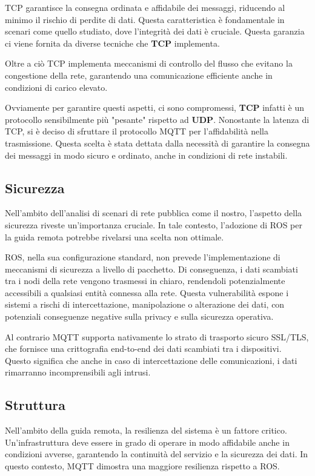 \noindent TCP garantisce la consegna ordinata e affidabile dei messaggi, riducendo al minimo il rischio di perdite di dati. Questa caratteristica è fondamentale in scenari come quello studiato, dove l'integrità dei dati è cruciale. Questa garanzia ci viene fornita da diverse tecniche che \textbf{TCP} implementa. 

\noindent Oltre a ciò TCP implementa meccanismi di controllo del flusso che evitano la congestione della rete, garantendo una comunicazione efficiente anche in condizioni di carico elevato.

\noindent Ovviamente per garantire questi aspetti, ci sono compromessi, \textbf{TCP} infatti è un protocollo sensibilmente più "pesante" rispetto ad \textbf{UDP}. Nonostante la latenza di TCP, si è deciso di sfruttare il protocollo MQTT per l'affidabilità nella trasmissione. Questa scelta è stata dettata dalla necessità di garantire la consegna dei messaggi in modo sicuro e ordinato, anche in condizioni di rete instabili.

\subsection{Sicurezza}
\noindent Nell'ambito dell'analisi di scenari di rete pubblica come il nostro, l'aspetto della sicurezza riveste un'importanza cruciale. In tale contesto, l'adozione di ROS per la guida remota potrebbe rivelarsi una scelta non ottimale.

\noindent ROS, nella sua configurazione standard, non prevede l'implementazione di meccanismi di sicurezza a livello di pacchetto. Di conseguenza, i dati scambiati tra i nodi della rete vengono trasmessi in chiaro, rendendoli potenzialmente accessibili a qualsiasi entità connessa alla rete. Questa vulnerabilità espone i sistemi a rischi di intercettazione, manipolazione o alterazione dei dati, con potenziali conseguenze negative sulla privacy e sulla sicurezza operativa.

\noindent Al contrario MQTT supporta nativamente lo strato di trasporto sicuro SSL/TLS, che fornisce una crittografia end-to-end dei dati scambiati tra i dispositivi. Questo significa che anche in caso di intercettazione delle comunicazioni, i dati rimarranno incomprensibili agli intrusi.

\subsection{Struttura}
Nell'ambito della guida remota, la resilienza del sistema è un fattore critico. Un'infrastruttura deve essere in grado di operare in modo affidabile anche in condizioni avverse, garantendo la continuità del servizio e la sicurezza dei dati. In questo contesto, MQTT dimostra una maggiore resilienza rispetto a ROS. 

